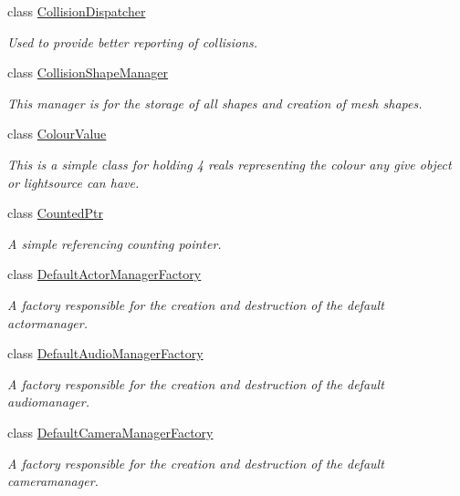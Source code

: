 \begin{DoxyCompactItemize}
class \hyperlink{classMezzanine_1_1CollisionDispatcher}{Collision\-Dispatcher}
\begin{DoxyCompactList}\small\item\em Used to provide better reporting of collisions. \end{DoxyCompactList}\item 
class \hyperlink{classMezzanine_1_1CollisionShapeManager}{Collision\-Shape\-Manager}
\begin{DoxyCompactList}\small\item\em This manager is for the storage of all shapes and creation of mesh shapes. \end{DoxyCompactList}\item 
class \hyperlink{classMezzanine_1_1ColourValue}{Colour\-Value}
\begin{DoxyCompactList}\small\item\em This is a simple class for holding 4 reals representing the colour any give object or lightsource can have. \end{DoxyCompactList}\item 
class \hyperlink{classMezzanine_1_1CountedPtr}{Counted\-Ptr}
\begin{DoxyCompactList}\small\item\em A simple referencing counting pointer. \end{DoxyCompactList}\item 
class \hyperlink{classMezzanine_1_1DefaultActorManagerFactory}{Default\-Actor\-Manager\-Factory}
\begin{DoxyCompactList}\small\item\em A factory responsible for the creation and destruction of the default actormanager. \end{DoxyCompactList}\item 
class \hyperlink{classMezzanine_1_1DefaultAudioManagerFactory}{Default\-Audio\-Manager\-Factory}
\begin{DoxyCompactList}\small\item\em A factory responsible for the creation and destruction of the default audiomanager. \end{DoxyCompactList}\item 
class \hyperlink{classMezzanine_1_1DefaultCameraManagerFactory}{Default\-Camera\-Manager\-Factory}
\begin{DoxyCompactList}\small\item\em A factory responsible for the creation and destruction of the default cameramanager. \end{DoxyCompactList}\item 

\end{DoxyCompactItemize}
